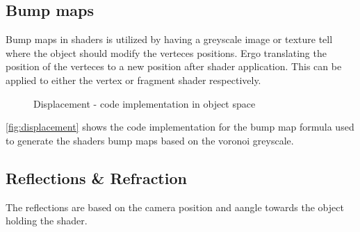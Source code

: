 \documentclass{article}
\begin{document}
\subsection{Bump maps}
\label{sec:bump_map}
Bump maps in shaders is utilized by having a greyscale image or texture tell where the object should modify the verteces positions. Ergo translating the position of the verteces to a new position after shader application. This can be applied to either the vertex or fragment shader respectively.

\begin{figure}[H]
    \centering
    
    \caption{Displacement - code implementation in object space}
    \label{fig:displacement}
\end{figure}
\autoref{fig:displacement} shows the code implementation for the bump map formula used to generate the shaders bump maps based on the voronoi greyscale.

\subsection{Reflections \& Refraction}
\label{sec:refl_refr}
The reflections are based on the camera position and aangle towards the object holding the shader.\\
\end{document}
